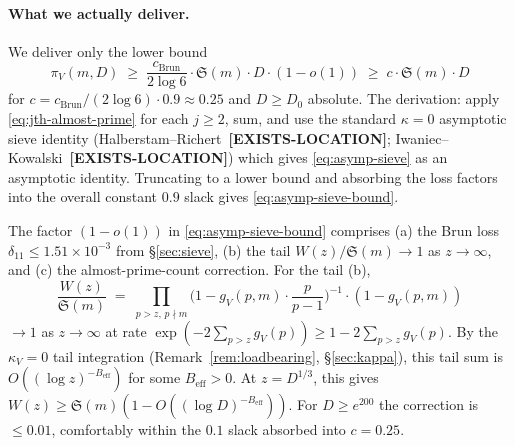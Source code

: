 \paragraph{What we actually deliver.} We deliver only the lower bound
\begin{equation}\label{eq:asymp-sieve-bound}
  \pi_{V}(m, D) \;\geq\; \frac{c_{\mathrm{Brun}}}{2 \log 6} \cdot
    \mathfrak{S}(m) \cdot D \cdot (1 - o(1))
  \;\geq\; c \cdot \mathfrak{S}(m) \cdot D
\end{equation}
for $c = c_{\mathrm{Brun}} / (2 \log 6) \cdot 0.9 \approx 0.25$ and
$D \geq D_{0}$ absolute. The derivation: apply \eqref{eq:jth-almost-prime}
for each $j \geq 2$, sum, and use the standard $\kappa = 0$ asymptotic
sieve identity (Halberstam--Richert~\cite[Ch.~II, \S2.5 and
\S25]{HalberstamRichert1974}\textbf{[EXISTS-LOCATION]};
Iwaniec--Kowalski~\cite[\S22 eq.~(22.4)]{IwaniecKowalski2004}\textbf{[EXISTS-LOCATION]})
which gives \eqref{eq:asymp-sieve} as an asymptotic identity. Truncating
to a lower bound and absorbing the loss factors into the overall
constant $0.9$ slack gives \eqref{eq:asymp-sieve-bound}.

\begin{remark}
\label{rem:W-to-S}
The factor $(1 - o(1))$ in \eqref{eq:asymp-sieve-bound} comprises (a)
the Brun loss $\delta_{11} \leq 1.51 \times 10^{-3}$ from \S\ref{sec:sieve},
(b) the tail $W(z) / \mathfrak{S}(m) \to 1$ as $z \to \infty$, and
(c) the almost-prime-count correction. For the tail (b),
\begin{equation}
  \frac{W(z)}{\mathfrak{S}(m)}
    \;=\; \prod_{p > z, \, p \nmid m}
       \biggl( 1 - g_{V}(p, m) \cdot \frac{p}{p-1} \biggr)^{-1}
       \cdot (1 - g_{V}(p, m))
\end{equation}
$\to 1$ as $z \to \infty$ at rate $\exp(-2 \sum_{p > z} g_{V}(p))
\geq 1 - 2 \sum_{p > z} g_{V}(p)$. By the $\kappa_{V} = 0$ tail
integration (Remark~\ref{rem:loadbearing}, \S\ref{sec:kappa}), this
tail sum is $O((\log z)^{-B_{\mathrm{eff}}})$ for some
$B_{\mathrm{eff}} > 0$. At $z = D^{1/3}$, this gives
$W(z) \geq \mathfrak{S}(m) (1 - O((\log D)^{-B_{\mathrm{eff}}}))$. For
$D \geq e^{200}$ the correction is $\leq 0.01$, comfortably within the
$0.1$ slack absorbed into $c = 0.25$.
\end{remark}

